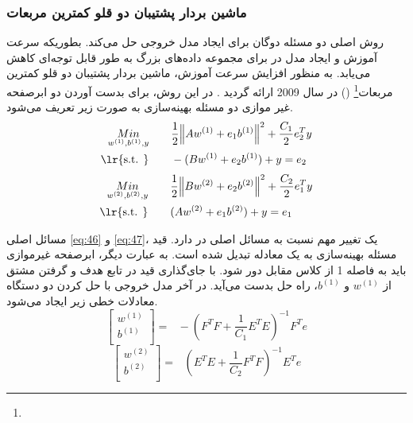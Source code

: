 \subsubsection{ماشین بردار پشتیبان دو قلو کمترین مربعات}\label{sec:2:2:3:1}
روش  اصلی دو مسئله دوگان برای ایجاد مدل خروجی حل می‌کند. بطوریکه سرعت آموزش و ایجاد مدل در  برای مجموعه داده‌های بزرگ به طور قابل توجه‌ای کاهش می‌یابد. به منظور افزایش سرعت آموزش، ماشین بردار پشتیبان دو قلو کمترین مربعات\footnote{}  ()  در سال 2009 ارائه گردید \cite{kumar2009}. در این روش، برای بدست آوردن دو ابرصفحه غیر موازی دو مسئله بهینه‌سازی به صورت زیر تعریف می‌شود.
\begin{equation}
\begin{split}
 \underset{{{w}^{(1)}},{{b}^{(1)}},y}{\mathop{Min}} \qquad &\frac{1}{2}{{\left\| A{{w}^{(1)}}+{{e}_{1}}{{b}^{(1)}} \right\|}^{2}}+\frac{{{C}_{1}}}{2}e_{2}^{T}y \\ 
\textrm{\lr{s.t. }} \qquad & -(B{{w}^{(1)}}+{{e}_{2}}{{b}^{(1)}})+y={{e}_{2}}
\end{split}
\label{eq:46}
\end{equation}
\begin{equation}
\begin{split}
\underset{{{w}^{(2)}},{{b}^{(2)}},y}{\mathop{Min}} \qquad & \frac{1}{2}{{\left\| B{{w}^{(2)}}+{{e}_{2}}{{b}^{(2)}} \right\|}^{2}}+\frac{{{C}_{2}}}{2}e_{1}^{T}y \\ 
\textrm{\lr{s.t. }} \qquad & (A{{w}^{(2)}}+{{e}_{1}}{{b}^{(2)}})+y={{e}_{1}}
\end{split}
\label{eq:47}
\end{equation}

مسائل اصلی \ref{eq:46} و \ref{eq:47}، یک تغییر مهم نسبت به مسائل اصلی در  دارد. قید مسئله بهینه‌سازی به یک معادله تبدیل شده است. به عبارت دیگر، ابرصفحه غیرموازی باید به فاصله 1 از کلاس مقابل دور شود. با جای‌گذاری قید در تابع هدف و گرفتن مشتق از ${{w}^{(1)}}$ و ${{b}^{(1)}}$، راه حل بدست می‌آید. در آخر مدل خروجی با حل کردن دو دستگاه معادلات خطی زیر ایجاد می‌شود.
\begin{equation}
\left[ \begin{matrix}
{{w}^{(1)}} \\
{{b}^{(1)}} \\
\end{matrix}\right]=\text{ }-{{({{F}^{T}}F+\frac{1}{{{C}_{1}}}{{E}^{T}}E)}^{-1}}{{F}^{T}}e
\label{eq:48}
\end{equation}
\begin{equation}
\left[ \begin{matrix}
{{w}^{(2)}} \\
{{b}^{(2)}} \\
\end{matrix}\right]=\text{ }{{({{E}^{T}}E+\frac{1}{{{C}_{2}}}{{F}^{T}}F)}^{-1}}{{E}^{T}}e
\label{eq:49}
\end{equation}

